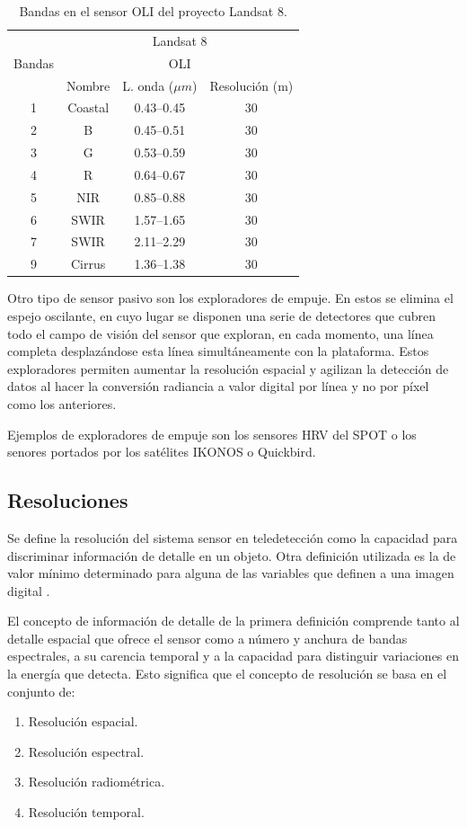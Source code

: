 \begin{table}
	\centering
	\caption[Bandas en el sensor OLI]{Bandas en el sensor OLI del proyecto Landsat 8.}
	\begin{tabular}{|c|c|c|c|}
		\hline
		& \multicolumn{3}{|c|}{Landsat 8} \\
		Bandas & \multicolumn{3}{|c|}{OLI} \\ 
		\cline{2-4}
		& Nombre & L. onda ($\mu m$) & Resolución (m)\\
		\hline \hline
		1 & Coastal & 0.43--0.45 & 30 \\ \hline
		2 & B & 0.45--0.51 & 30 \\ \hline
		3 & G & 0.53--0.59 & 30 \\ \hline
		4 & R & 0.64--0.67 & 30 \\ \hline
		5 & NIR & 0.85--0.88 & 30 \\ \hline
		6 & SWIR & 1.57--1.65 & 30 \\ \hline
		7 & SWIR & 2.11--2.29 & 30 \\ \hline
		9 & Cirrus & 1.36--1.38 & 30 \\ \hline
	\end{tabular}
	\label{tab:sensoresOLI}
\end{table}

Otro tipo de sensor pasivo son los exploradores de empuje. En estos se elimina el espejo oscilante, en cuyo lugar se disponen una serie de detectores que cubren todo el campo de visión del sensor que exploran, en cada momento, una línea completa desplazándose esta línea simultáneamente con la plataforma. Estos exploradores permiten aumentar la resolución espacial y agilizan la detección de datos al hacer la conversión radiancia a valor digital por línea y no por píxel como los anteriores.\Sep

Ejemplos de exploradores de empuje son los sensores \ac{HRV} del SPOT o los senores portados por los satélites IKONOS o Quickbird.

\subsection{Resoluciones}

Se define la resolución del sistema sensor en teledetección como la capacidad para discriminar información de detalle en un objeto. Otra definición utilizada es la de valor mínimo determinado para alguna de las variables que definen a una imagen digital \citep{chuvieco2002teledeteccion} .\Sep

El concepto de información de detalle de la primera definición comprende tanto al detalle espacial que ofrece el sensor como a número y anchura de bandas espectrales, a su carencia temporal y a la capacidad para distinguir variaciones en la energía que detecta. Esto significa que el concepto de resolución se basa en el conjunto de:
\begin{enumerate}
	\item Resolución espacial.
	\item Resolución espectral.
	\item Resolución radiométrica.
	\item Resolución temporal.
\end{enumerate}

